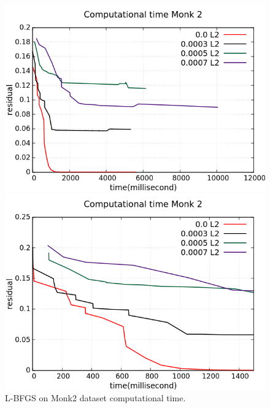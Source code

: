 \begin{figure}[H]
	\centering
	\begin{minipage}[t]{0.5\linewidth}
		\includegraphics[width=\linewidth]{data/LBFGS/Monk2/Monk2_LBFGS_L2_CT_standard.png}
	\end{minipage}%
	\begin{minipage}[t]{0.5\linewidth}
		\includegraphics[width=\linewidth]{data/LBFGS/Monk2/Monk2_LBFGS_L2_CT_zoom.png}
	\end{minipage}
	\caption{L-BFGS on Monk2 dataset computational time.}
\end{figure}

